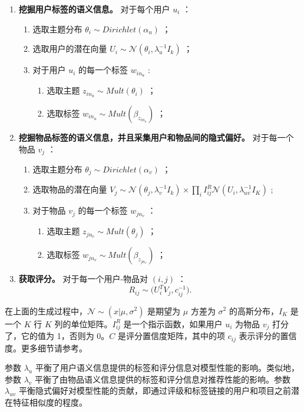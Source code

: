 \begin{enumerate}[itemindent=1em]
	\item \textbf{挖掘用户标签的语义信息。} 对于每个用户 $u_i$ ：
	\begin{enumerate}[itemindent=1em]
		\item 选取主题分布 $\theta_i \sim Dirichlet(\alpha_u)$ ；
		\item 选取用户的潜在向量 $U_i \sim \mathcal{N}(\theta_i, \lambda_u^{-1} I_k)$ ；
		\item 对于用户 $u_i$ 的每一个标签 $w_{in_u}$ :
		\begin{enumerate}[itemindent=1em]
			\item 选取主题 $z_{in_u} \sim Mult(\theta_i)$ ；
			\item 选取标签 $w_{in_u} \sim Mult(\beta_{z_{in_u}}) $ ；
		\end{enumerate}
	\end{enumerate}
	\item \textbf{挖掘物品标签的语义信息，并且采集用户和物品间的隐式偏好。} 对于每一个物品 $v_j$ ：
	\begin{enumerate}[itemindent=1em]
		\item 选取主题分布 $\theta_j \sim Dirichlet(\alpha_v)$ ；
		\item 选取物品的潜在向量 $V_j \sim \mathcal{N}(\theta_j, \lambda_v^{-1} I_k) \times \prod\limits_{i} I_{ij}^R \mathcal{N}(U_i, \lambda_{uv}^{-1}I_K ) $ ;
		\item 对于物品 $v_j$ 的每一个标签 $w_{jn_v}$ ：
		\begin{enumerate}[itemindent=1em]
			\item 选取主题 $z_{jn_v} \sim Mult(\theta_j)$ ；
			\item 选取标签 $w_{jn_v} \sim Mult(\beta_{z_{jn_v}}) $ ；
		\end{enumerate}
	\end{enumerate}
	\item \textbf{获取评分。} 对于每一个用户-物品对 $(i,j)$ ：
	$$
		R_{ij} \sim \mathcal(U_i^ T V_j, c_{ij}^{-1}).
	$$
\end{enumerate}

在上面的生成过程中，$\mathcal{N} \sim (x | \mu, \sigma^2)$ 是期望为 $\mu$ 方差为 $\sigma^2$ 的高斯分布，$I_K$ 是一个 $K$ 行 $K$ 列的单位矩阵。$I_{ij}^R$ 是一个指示函数，如果用户 $u_i$ 为物品 $v_j$ 打分了，它的值为 1，否则为 0。$C$ 是评分置信度矩阵，其中的项 $c_{ij}$ 表示评分的置信度。更多细节请参考\cite{Wang2011Collaborative}。

参数 $\lambda_u$ 平衡了用户语义信息提供的标签和评分信息对模型性能的影响。类似地，参数 $\lambda_v$ 平衡了由物品语义信息提供的标签和评分信息对推荐性能的影响。参数 $\lambda_{uv}$ 平衡隐式偏好对模型性能的贡献，即通过评级和标签链接的用户和项目之前潜在特征相似度的程度。

